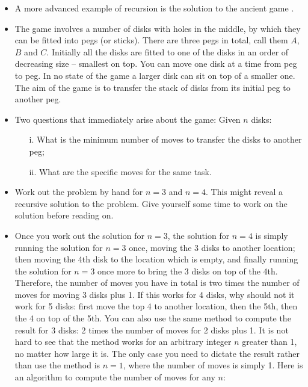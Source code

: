 \documentclass[a4paper]{article}
\begin{document}
{\begin{itemize}
\item A more advanced example of recursion is the solution to the ancient
game \href{https://en.wikipedia.org/wiki/Tower_of_Hanoi}{}.

\item The game involves a number of disks with holes in the middle, by which
they can be fitted into pegs (or sticks). There are three pegs in total, call
them $A$, $B$ and $C$. Initially all the disks are fitted to one of the disks in
an order of decreasing size -- smallest on top. You can move one disk at a time
from peg to peg. In no state of the game a larger disk can sit on top of a
smaller one. The aim of the game is to transfer the stack of disks from its
initial peg to another peg.

\item Two questions that immediately arise about the game: Given $n$ disks:
	\begin{itemize}
	\item[i.] What is the minimum number of moves to transfer the disks to
	another peg;
	\item[ii.] What are the specific moves for the same task. 
	\end{itemize}

\item Work out the problem by hand for $n=3$ and $n=4$. This might reveal a recursive
solution to the problem. Give yourself some time to work on the solution before
reading on.

\item Once you work out the solution for $n=3$, the solution for $n=4$ is simply
running the solution for $n=3$ once,  moving the 3 disks to another location;
then moving the 4th disk to the location which is empty, and finally running the
solution for $n=3$ once more to bring the 3 disks on top of the 4th. Therefore,
the number of moves you have in total is two times the number of moves for
moving 3 disks plus 1. If this works for 4 disks, why should not it work for 5
disks: first move the top 4 to another location, then the 5th, then the 4 on top
of the 5th. You can also use the same method to compute the result for 3 disks:
2 times the number of moves for 2 disks plus 1. It is not hard to see that the
method works for an arbitrary integer $n$ greater than 1, no matter how large it
is. The only case you need to dictate the result rather than use the method is
$n=1$, where the number of moves is simply 1. Here is an algorithm to compute
the number of moves for any $n$:


\end{itemize}}
\end{document}
